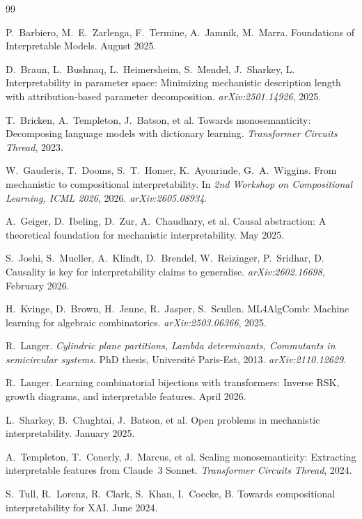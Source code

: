 \documentclass[10pt]{article}
\begin{document}
\begin{thebibliography}{99}

P.~Barbiero, M.~E.~Zarlenga, F.~Termine, A.~Jamnik, M.~Marra.
\newblock Foundations of Interpretable Models.
\newblock August 2025.

D.~Braun, L.~Bushnaq, L.~Heimersheim, S.~Mendel, J.~Sharkey, L.
\newblock Interpretability in parameter space: Minimizing mechanistic
description length with attribution-based parameter decomposition.
\newblock \emph{arXiv:2501.14926}, 2025.

T.~Bricken, A.~Templeton, J.~Batson, et al.
\newblock Towards monosemanticity: Decomposing language models with dictionary
learning.
\newblock \emph{Transformer Circuits Thread}, 2023.

W.~Gauderis, T.~Dooms, S.~T.~Homer, K.~Ayonrinde, G.~A.~Wiggins.
\newblock From mechanistic to compositional interpretability.
\newblock In \emph{2nd Workshop on Compositional Learning, ICML 2026}, 2026.
\newblock \emph{arXiv:2605.08934}.

A.~Geiger, D.~Ibeling, D.~Zur, A.~Chaudhary, et al.
\newblock Causal abstraction: A theoretical foundation for mechanistic
interpretability.
\newblock May 2025.

S.~Joshi, S.~Mueller, A.~Klindt, D.~Brendel, W.~Reizinger, P.~Sridhar, D.
\newblock Causality is key for interpretability claims to generalise.
\newblock \emph{arXiv:2602.16698}, February 2026.

H.~Kvinge, D.~Brown, H.~Jenne, R.~Jasper, S.~Scullen.
\newblock ML4AlgComb: Machine learning for algebraic combinatorics.
\newblock \emph{arXiv:2503.06366}, 2025.

R.~Langer.
\newblock \emph{Cylindric plane partitions, Lambda determinants, Commutants in
semicircular systems}.
\newblock PhD thesis, Universit\'{e} Paris-Est, 2013.
\newblock \emph{arXiv:2110.12629}.

R.~Langer.
\newblock Learning combinatorial bijections with transformers: Inverse RSK,
growth diagrams, and interpretable features.
\newblock April 2026.

L.~Sharkey, B.~Chughtai, J.~Batson, et al.
\newblock Open problems in mechanistic interpretability.
\newblock January 2025.

A.~Templeton, T.~Conerly, J.~Marcus, et al.
\newblock Scaling monosemanticity: Extracting interpretable features from
Claude~3 Sonnet.
\newblock \emph{Transformer Circuits Thread}, 2024.

S.~Tull, R.~Lorenz, R.~Clark, S.~Khan, I.~Coecke, B.
\newblock Towards compositional interpretability for XAI.
\newblock June 2024.

\end{thebibliography}
\end{document}

